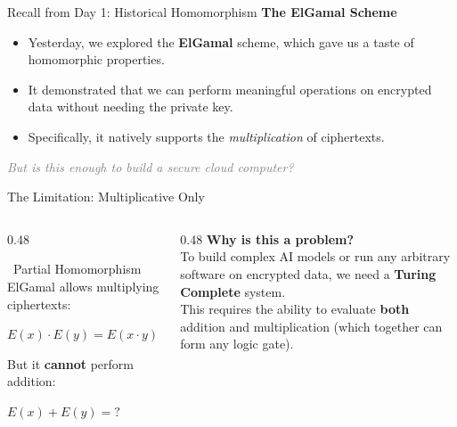 \documentclass[aspectratio=169, 10pt]{beamer}
\begin{document}
\begin{frame}{Recall from Day 1: Historical Homomorphism}
    \Large
    \textbf{The ElGamal Scheme}
    \vspace{0.4cm}
    \normalsize
    \begin{itemize}
        \item Yesterday, we explored the \textbf{ElGamal} scheme, which gave us a taste of homomorphic properties.
        \item It demonstrated that we can perform meaningful operations on encrypted data without needing the private key.
        \item Specifically, it natively supports the \textit{multiplication} of ciphertexts.
    \end{itemize}
    \vspace{0.8cm}
    \begin{center}
        \textit{\textcolor{gray}{But is this enough to build a secure cloud computer?}}
    \end{center}
\end{frame}

\begin{frame}{The Limitation: Multiplicative Only}
    \begin{columns}
        \begin{column}{0.48\textwidth}
            \begin{alertblock}{\faExclamationTriangle \ Partial Homomorphism}
                ElGamal allows multiplying ciphertexts:
                \begin{center}
                    \Large $E(x) \cdot E(y) = E(x \cdot y)$
                \end{center}
                \vspace{0.2cm}
                \normalsize But it \textbf{cannot} perform addition:
                \begin{center}
                    \Large $E(x) + E(y) = \text{?}$
                \end{center}
            \end{alertblock}
        \end{column}
        
        \begin{column}{0.48\textwidth}
            \textbf{Why is this a problem?} \\
            \vspace{0.3cm}
            To build complex AI models or run any arbitrary software on encrypted data, we need a \textbf{Turing Complete} system. \\
            \vspace{0.3cm}
            This requires the ability to evaluate \textbf{both} addition and multiplication (which together can form any logic gate).
        \end{column}
    \end{columns}
\end{frame}
\end{document}
